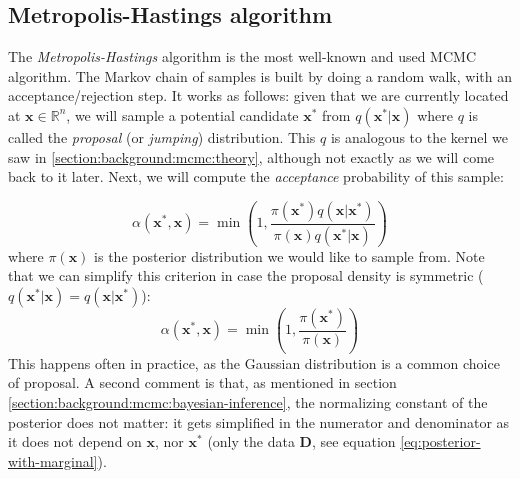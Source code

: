 \documentclass[12pt]{memoir}
\newcommand{\mb}{\mathbf}
\newcommand{\tb}{\textbf}
\newcommand{\ti}{\textit}
\begin{document}


\subsection{Metropolis-Hastings algorithm}\label{section:Metropolis-Hastings}
The \ti{Metropolis-Hastings} algorithm is the most well-known and used MCMC algorithm. The Markov chain of samples is built by doing a random walk, with an acceptance/rejection step. It works as follows: given that we are currently located at $\mb x \in \mathbb{R}^n$, we will sample a potential candidate $\mb x^*$ from $q(\mb x^*|\mb x)$ where $q$ is called the \ti{proposal} (or \ti{jumping}) distribution. This $q$ is analogous to the kernel we saw in \ref{section:background:mcmc:theory}, although not exactly as we will come back to it later. Next, we will compute the \ti{acceptance} probability of this sample:

\begin{equation}
    \alpha(\mb x^*, \mb x) = \min\left(1, \frac{\pi(\mb x^*) q(\mb x|\mb x^*)}{\pi(\mb x) q(\mb x^*|\mb x)}\right)
\end{equation}
where $\pi(\mb x)$ is the posterior distribution we would like to sample from. Note that we can simplify this criterion in case the proposal density is symmetric ($q(\mb x^*|\mb x) = q(\mb x|\mb x^*)$):
\begin{equation}
    \alpha(\mb x^*, \mb x) = \min\left(1, \frac{\pi(\mb x^*)}{\pi(\mb x)}\right)
\end{equation}
This happens often in practice, as the Gaussian distribution is a common choice of proposal.
A second comment is that, as mentioned in section \ref{section:background:mcmc:bayesian-inference}, the normalizing constant of the posterior does not matter: it gets simplified in the numerator and denominator as it does not depend on $\mb x$, nor $\mb x^*$ (only the data \tb D, see equation \ref{eq:posterior-with-marginal}). \medbreak
\end{document}
